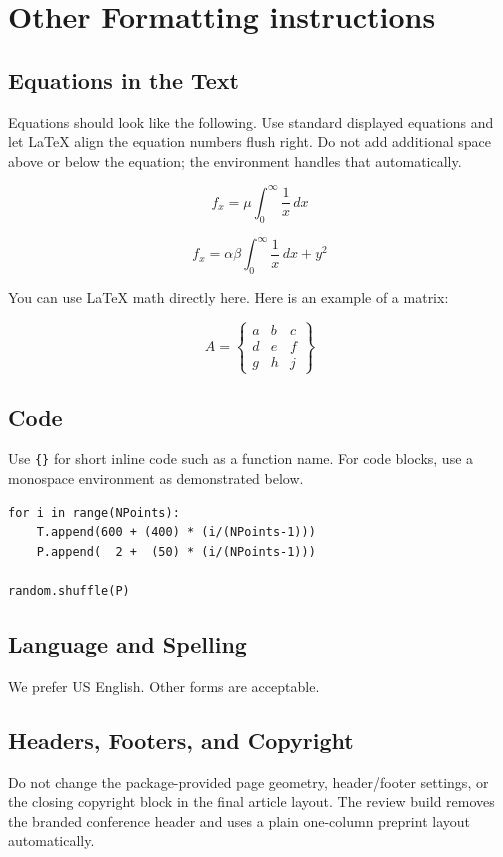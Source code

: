 \documentclass[10pt,letterpaper]{article}
\begin{document}
\section{Other Formatting instructions}
\subsection{Equations in the Text}
Equations should look like the following. Use standard displayed equations and let LaTeX align the
equation numbers flush right. Do not add additional space above or below the equation; the
environment handles that automatically.

\begin{equation}
  f_x = \mu \int_0^\infty \frac{1}{x}\,dx
\end{equation}

\begin{equation}
  f_x = \alpha\beta \int_0^\infty \frac{1}{x}\,dx + y^2
\end{equation}

You can use LaTeX math directly here. Here is an example of a matrix:

\begin{equation}
  A =
  \left\{
  \begin{matrix}
    a & b & c \\
    d & e & f \\
    g & h & j
  \end{matrix}
  \right\}
\end{equation}

\subsection{Code}
Use \texttt{\string\texttt\{\}} for short inline code such as a function name. For code blocks, use
a monospace environment as demonstrated below.

\begin{lstlisting}[style=psecode]
for i in range(NPoints):
    T.append(600 + (400) * (i/(NPoints-1)))
    P.append(  2 +  (50) * (i/(NPoints-1)))

random.shuffle(P)
\end{lstlisting}

\subsection{Language and Spelling}
We prefer US English. Other forms are acceptable.

\subsection{Headers, Footers, and Copyright}
Do not change the package-provided page geometry, header/footer settings, or the closing copyright
block in the final article layout. The review build removes the branded conference header and uses a
plain one-column preprint layout automatically.
\end{document}

